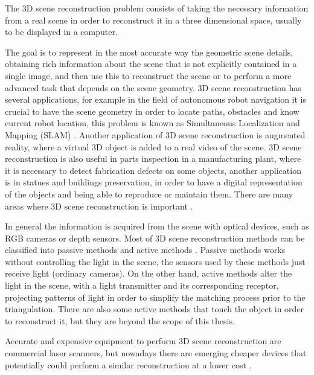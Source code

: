 \indent The 3D scene reconstruction problem consists of taking the
necessary information from a real scene in order to reconstruct
it in a three dimensional space, usually to be displayed 
in a computer. 

The goal is to represent in the most accurate way the geometric scene details, obtaining rich 
information about the scene that is not explicitly contained in a single image, and then use this 
to reconstruct the scene or to perform a more advanced task that depends on the scene geometry. 
3D scene reconstruction has several applications, for example in the field of autonomous robot navigation it is crucial to have 
the scene geometry in order to locate paths, obstacles and know current robot location, this problem is known as 
Simultaneous Localization and Mapping (SLAM) \cite{SLAM06}. Another application of 3D scene reconstruction is augmented reality, 
where a virtual 3D object is added to a real video of the scene. 3D scene reconstruction is also useful in parts inspection 
in a manufacturing plant, where it is necessary to detect
 fabrication defects on some objects, another application is in statues and buildings preservation, in order to have a digital representation 
of the objects and being able to reproduce or maintain them. There are many areas where 3D scene reconstruction is important \cite{apps2009}.

 
In general the information is acquired
 from the scene with optical devices, such as RGB cameras or depth sensors.
Most of 3D scene reconstruction methods can be classified into passive methods and active methods \cite{lanman}.
Passive methods works without controlling the light in the scene, the sensors used by these methods just receive light (ordinary cameras). 
On the other hand, active methods alter the light in the scene, with a light transmitter and its corresponding 
receptor, projecting patterns of light in order to simplify the matching process prior to the triangulation. 
There are also some active methods that touch the object in order to reconstruct it, but they are beyond 
the scope of this thesis. 

Accurate and expensive equipment to perform 3D scene reconstruction are commercial laser scanners,
 but nowadays there are emerging cheaper devices that 
potentially could perform 
a similar reconstruction at a lower cost \cite{kinectReview13}.


